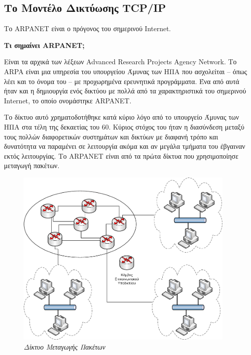 %
%
\setcounter{section}{2}
\setcounter{subsection}{1}
\subsection{Το Μοντέλο Δικτύωσης TCP/IP}
Το ARPANET είναι ο πρόγονος του σημερινού Internet.

\begin{inthebox}
\textbf{Τι σημαίνει ARPANET;} 

Είναι τα αρχικά των λέξεων Advanced Research Projects Agency Network.
Το ARPA είναι μια υπηρεσία του υπουργείου Άμυνας των ΗΠΑ που ασχολείται -- όπως λέει και το όνομα του --
με προχωρημένα ερευνητικά προγράμματα. Ένα από αυτά ήταν και η δημιουργία ενός δικτύου με πολλά από τα χαρακτηριστικά του σημερινού Internet, το οποίο ονομάστηκε ARPANET.\\
\end{inthebox}

Το δίκτυο αυτό χρηματοδοτήθηκε κατά κύριο λόγο από το υπουργείο Άμυνας των ΗΠΑ
στα τέλη της δεκαετίας του 60. Κύριος στόχος του ήταν η διασύνδεση μεταξύ τους
πολλών διαφορετικών συστημάτων και δικτύων με διαφανή τρόπο και δυνατότητα να παραμένει
σε λειτουργία ακόμα και αν μεγάλα τμήματα του έβγαιναν εκτός λειτουργίας. Το ARPANET είναι
από τα πρώτα δίκτυα που χρησιμοποίησε μεταγωγή πακέτων.

\begin{figure}[!ht]
  \centering
  \includegraphics[width=0.95\textwidth]{images/chapter1/1-2}
  \caption {\textsl{Δίκτυο Μεταγωγής Πακέτων}}
  \label{1-2}
\end{figure}

